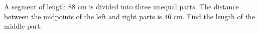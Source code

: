 A segment of length $88$ cm is divided into three unequal parts. The distance between the midpoints of the left and right parts is $46$ cm. Find the length of the middle part.
